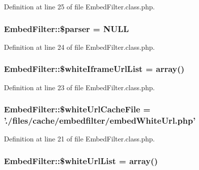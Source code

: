 Definition at line 25 of file Embed\-Filter.\-class.\-php.

\hypertarget{classEmbedFilter_aae7e65cd7dd322d86081df16add1a5ed}{
\subsubsection[{\$parser}]{\setlength{\rightskip}{0pt plus 5cm}Embed\-Filter\-::\$parser = N\-U\-L\-L}}\label{classEmbedFilter_aae7e65cd7dd322d86081df16add1a5ed}


Definition at line 24 of file Embed\-Filter.\-class.\-php.

\hypertarget{classEmbedFilter_ad1a091dd6db8753f50b269bac16e2868}{
\subsubsection[{\$white\-Iframe\-Url\-List}]{\setlength{\rightskip}{0pt plus 5cm}Embed\-Filter\-::\$white\-Iframe\-Url\-List = array()}}\label{classEmbedFilter_ad1a091dd6db8753f50b269bac16e2868}


Definition at line 23 of file Embed\-Filter.\-class.\-php.

\hypertarget{classEmbedFilter_a2c04bd8059ab27b14923923317ad0756}{
\subsubsection[{\$white\-Url\-Cache\-File}]{\setlength{\rightskip}{0pt plus 5cm}Embed\-Filter\-::\$white\-Url\-Cache\-File = './files/cache/embedfilter/embed\-White\-Url.\-php'}}\label{classEmbedFilter_a2c04bd8059ab27b14923923317ad0756}


Definition at line 21 of file Embed\-Filter.\-class.\-php.

\hypertarget{classEmbedFilter_a3c991ef8c125e62213cc5c686712be8f}{
\subsubsection[{\$white\-Url\-List}]{\setlength{\rightskip}{0pt plus 5cm}Embed\-Filter\-::\$white\-Url\-List = array()}}\label{classEmbedFilter_a3c991ef8c125e62213cc5c686712be8f}



